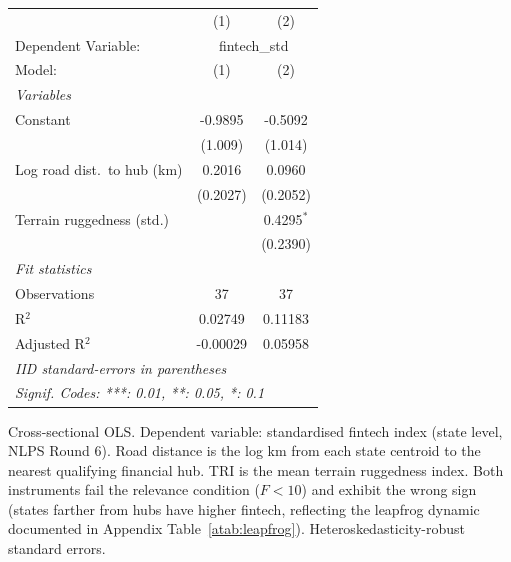 
\begingroup
\centering
\begin{tabular}{lcc}
   \tabularnewline \midrule \midrule
                                & (1)      & (2) \\   
   Dependent Variable: & \multicolumn{2}{c}{fintech\_std}\\
   Model:                       & (1)      & (2)\\  
   \midrule
   \emph{Variables}\\
   Constant                     & -0.9895  & -0.5092\\   
                                & (1.009)  & (1.014)\\   
   Log road dist.\ to hub (km)  & 0.2016   & 0.0960\\   
                                & (0.2027) & (0.2052)\\   
   Terrain ruggedness (std.)    &          & 0.4295$^{*}$\\   
                                &          & (0.2390)\\   
   \midrule
   \emph{Fit statistics}\\
   Observations                 & 37       & 37\\  
   R$^2$                        & 0.02749  & 0.11183\\  
   Adjusted R$^2$               & -0.00029 & 0.05958\\  
   \midrule \midrule
   \multicolumn{3}{l}{\emph{IID standard-errors in parentheses}}\\
   \multicolumn{3}{l}{\emph{Signif. Codes: ***: 0.01, **: 0.05, *: 0.1}}\\
\end{tabular}
 
\par \raggedright 
Cross-sectional OLS. Dependent variable: standardised fintech index (state level, NLPS Round 6). Road distance is the log km from each state centroid to the nearest qualifying financial hub. TRI is the mean terrain ruggedness index. Both instruments fail the relevance condition ($F<10$) and exhibit the wrong sign (states farther from hubs have higher fintech, reflecting the leapfrog dynamic documented in Appendix Table~\ref{atab:leapfrog}). Heteroskedasticity-robust standard errors.
\par\endgroup


